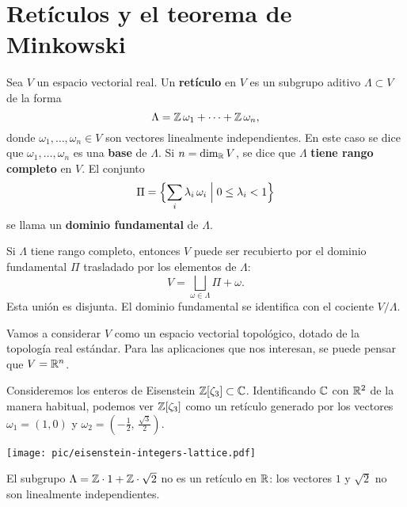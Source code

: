 
\section{Retículos y el teorema de Minkowski}

\begin{definicion}
  Sea $V$ un espacio vectorial real. Un \textbf{retículo} en $V$ es un subgrupo
  aditivo $\Lambda \subset V$ de la forma
  $$\Lambda = \mathbb{Z}\,\omega_1 + \cdots + \mathbb{Z}\,\omega_n,$$
  donde $\omega_1,\ldots,\omega_n \in V$ son vectores linealmente
  independientes. En este caso se dice que $\omega_1,\ldots,\omega_n$ es una
  \textbf{base} de $\Lambda$. Si $n = \dim_{\mathbb{R}} V$, se dice que $\Lambda$
  \textbf{tiene rango completo} en $V$. El conjunto
  $$\Pi = \Bigl\{ \sum_i \lambda_i\,\omega_i \Bigm| 0 \le \lambda_i < 1 \Bigr\}$$
  se llama un \textbf{dominio fundamental} de $\Lambda$.
\end{definicion}

\begin{comentario}
  Si $\Lambda$ tiene rango completo, entonces $V$ puede ser recubierto por el
  dominio fundamental $\Pi$ trasladado por los elementos de $\Lambda$:
  $$V = \bigsqcup_{\omega \in \Lambda} \Pi + \omega.$$
  Esta unión es disjunta. El dominio fundamental se identifica con el cociente
  $V/\Lambda$.
\end{comentario}

\begin{comentario}
  Vamos a considerar $V$ como un espacio vectorial topológico, dotado de la
  topología real estándar. Para las aplicaciones que nos interesan, se puede
  pensar que $V = \mathbb{R}^n$.
\end{comentario}

\begin{ejemplo}
  Consideremos los enteros de Eisenstein
  $\mathbb{Z} [\zeta_3] \subset \mathbb{C}$. Identificando $\mathbb{C}$ con $\mathbb{R}^2$ de la manera
  habitual, podemos ver $\mathbb{Z} [\zeta_3]$ como un retículo generado por los
  vectores $\omega_1 = (1,0)$ y
  $\omega_2 = \left(-\frac{1}{2}, \, \frac{\sqrt{3}}{2}\right)$.

  \begin{center}
    \texttt{[image: pic/eisenstein-integers-lattice.pdf]}
  \end{center}
\end{ejemplo}

\begin{ejemplo}
  El subgrupo $\Lambda = \mathbb{Z}\cdot 1 + \mathbb{Z}\cdot \sqrt{2}$ no es un retículo en
  $\mathbb{R}$: los vectores $1$ y $\sqrt{2}$ no son linealmente independientes.
\end{ejemplo}

